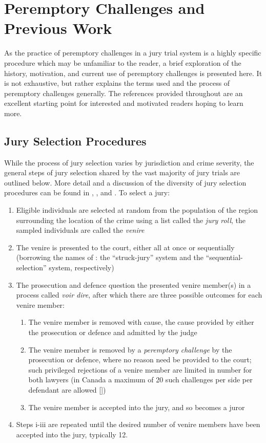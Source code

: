 \section{Peremptory Challenges and Previous Work} \label{c:background}

As the practice of peremptory challenges in a jury trial system is a highly specific procedure which may be unfamiliar to the
reader, a brief exploration of the history, motivation, and current use of peremptory challenges is presented here. It is not
exhaustive, but rather explains the terms used and the process of peremptory challenges generally. The references provided
throughout are an excellent starting point for interested and motivated readers hoping to learn more.

\subsection{Jury Selection Procedures} \label{sec:jurysel}

While the process of jury selection varies by jurisdiction and crime severity, the general steps of jury selection shared by the
vast majority of jury trials are outlined below. More detail and a discussion of the diversity of jury selection procedures can be
found in \cite{ford2010}, \cite{hansvidjudging}, and \cite{vandykejurysel}. To select a jury:

\begin{enumerate}
  \item Eligible individuals are selected at random from the population of the region surrounding the location of the crime using
    a list called the \textit{jury roll}, the sampled individuals are called the \textit{venire}
  \item The venire is presented to the court, either all at once or sequentially (borrowing the names of \cite{ford2010}: the
    ``struck-jury'' system and the ``sequential-selection'' system, respectively)
  \item The prosecution and defence question the presented venire member(s) in a process called \textit{voir dire}, after which there are three possible
    outcomes for each venire member:
    \begin{enumerate}
      \item The venire member is removed with cause, the cause provided by either the prosecution or defence and admitted by
        the judge
      \item The venire member is removed by a \textit{peremptory challenge} by the prosecution or defence, where no reason
        need be provided to the court; such privileged rejections of a venire member are limited in number for both lawyers (in
        Canada a maximum of 20 such challenges per side per defendant are allowed [\cite{perempchallaw}])
      \item The venire member is accepted into the jury, and so becomes a juror
    \end{enumerate}
  \item Steps i-iii are repeated until the desired number of venire members have been accepted into the jury, typically 12.
\end{enumerate}

